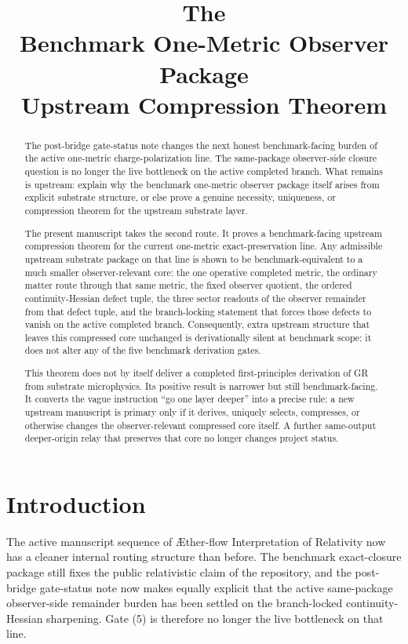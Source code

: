 \documentclass[11pt]{article}
\title{\textbf{The \TheoryName{}}\\[0.4em]
\large Benchmark One-Metric Observer Package\\
\large Upstream Compression Theorem}
\author{}
\date{}
\newcommand{\Aflow}{\AE{}ther-flow}
\newcommand{\TheoryName}{\Aflow{} Interpretation of Relativity}
\begin{document}
\maketitle

\begin{abstract}
The post-bridge gate-status note changes the next honest benchmark-facing burden of the active one-metric charge-polarization line. The same-package observer-side closure question is no longer the live bottleneck on the active completed branch. What remains is upstream: explain why the benchmark one-metric observer package itself arises from explicit substrate structure, or else prove a genuine necessity, uniqueness, or compression theorem for the upstream substrate layer.

The present manuscript takes the second route. It proves a benchmark-facing upstream compression theorem for the current one-metric exact-preservation line. Any admissible upstream substrate package on that line is shown to be benchmark-equivalent to a much smaller observer-relevant core: the one operative completed metric, the ordinary matter route through that same metric, the fixed observer quotient, the ordered continuity-Hessian defect tuple, the three sector readouts of the observer remainder from that defect tuple, and the branch-locking statement that forces those defects to vanish on the active completed branch. Consequently, extra upstream structure that leaves this compressed core unchanged is derivationally silent at benchmark scope: it does not alter any of the five benchmark derivation gates.

This theorem does not by itself deliver a completed first-principles derivation of GR from substrate microphysics. Its positive result is narrower but still benchmark-facing. It converts the vague instruction ``go one layer deeper'' into a precise rule: a new upstream manuscript is primary only if it derives, uniquely selects, compresses, or otherwise changes the observer-relevant compressed core itself. A further same-output deeper-origin relay that preserves that core no longer changes project status.
\end{abstract}

\section{Introduction}

The active manuscript sequence of \TheoryName{} now has a cleaner internal routing structure than before. The benchmark exact-closure package still fixes the public relativistic claim of the repository, and the post-bridge gate-status note now makes equally explicit that the active same-package observer-side remainder burden has been settled on the branch-locked continuity-Hessian sharpening. Gate (5) is therefore no longer the live bottleneck on that line.
\end{document}
